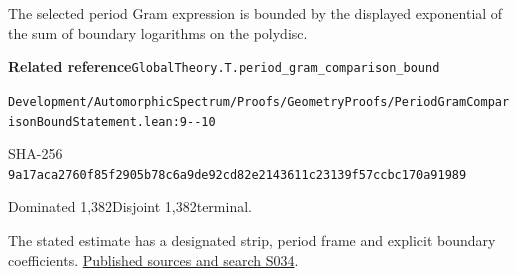
\begin{formalstatement}[D340]\label{decomp:D340}
The selected period Gram expression is bounded by the displayed exponential of the sum of boundary logarithms on the polydisc.
\end{formalstatement}
{\small\raggedright\noindent\textsf{\bfseries Related reference}\quad \nolinkurl{GlobalTheory.T.period_gram_comparison_bound}\par\noindent \nolinkurl{Development/AutomorphicSpectrum/Proofs/GeometryProofs/PeriodGramComparisonBoundStatement.lean:9--10}\par\noindent SHA-256 \nolinkurl{9a17aca2760f85f2905b78c6a9de92cd82e2143611c23139f57ccbc170a91989}\par\noindent Dominated 1,382\quad Disjoint 1,382\quad terminal.\par}
The stated estimate has a designated strip, period frame and explicit boundary coefficients.
\hyperref[lit:S034]{Published sources and search S034}.
